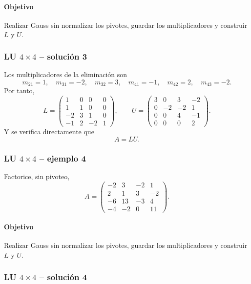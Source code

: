 \paragraph{Objetivo}
Realizar Gauss sin normalizar los pivotes, guardar los multiplicadores y construir $L$ y $U$.



\subsubsection*{LU $4\times 4$ -- solución 3}

Los multiplicadores de la eliminación son
\[
m_{21}=1,\quad m_{31}=-2,\quad m_{32}=3,\quad m_{41}=-1,\quad m_{42}=2,\quad m_{43}=-2.
\]
Por tanto,
\[
L=\begin{pmatrix}1 & 0 & 0 & 0\\1 & 1 & 0 & 0\\-2 & 3 & 1 & 0\\-1 & 2 & -2 & 1\end{pmatrix},\qquad U=\begin{pmatrix}3 & 0 & 3 & -2\\0 & -2 & -2 & 1\\0 & 0 & 4 & -1\\0 & 0 & 0 & 2\end{pmatrix}.
\]
Y se verifica directamente que
\[
\boxed{A=LU}.
\]


\subsubsection*{LU $4\times 4$ -- ejemplo 4}

Factorice, sin pivoteo,
\[
A=\begin{pmatrix}-2 & 3 & -2 & 1\\2 & 1 & 3 & -2\\-6 & 13 & -3 & 4\\-4 & -2 & 0 & 11\end{pmatrix}.
\]

\paragraph{Objetivo}
Realizar Gauss sin normalizar los pivotes, guardar los multiplicadores y construir $L$ y $U$.



\subsubsection*{LU $4\times 4$ -- solución 4}

